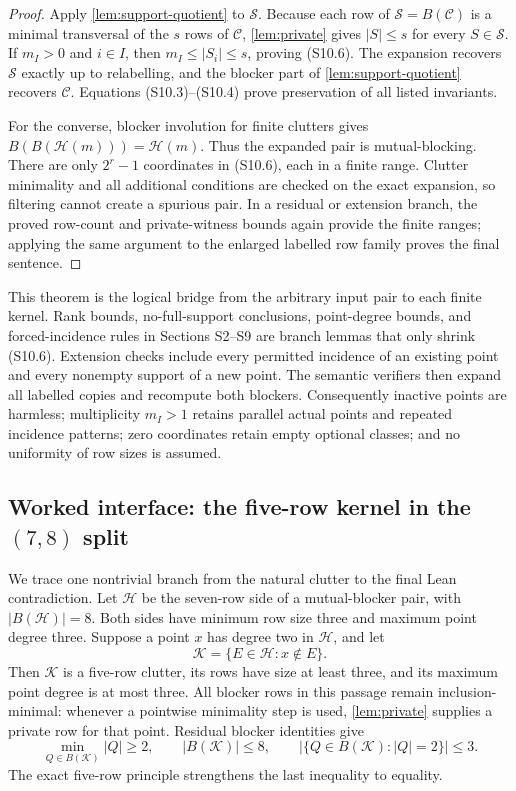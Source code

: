\documentclass[11pt,a4paper]{article}
\theoremstyle{definition}
\newcommand{\blocker}{B}
\begin{document}
\begin{proof}
Apply \cref{lem:support-quotient} to $\mathcal S$.  Because each row of
$\mathcal S=\blocker(\mathcal C)$ is a minimal transversal of the $s$ rows
of $\mathcal C$, \cref{lem:private} gives $|S|\leq s$ for every
$S\in\mathcal S$.  If $m_I>0$ and $i\in I$, then
$m_I\leq|S_i|\leq s$, proving (S10.6).  The expansion recovers
$\mathcal S$ exactly up to relabelling, and the blocker part of
\cref{lem:support-quotient} recovers $\mathcal C$.  Equations
(S10.3)--(S10.4) prove preservation of all listed invariants.

For the converse, blocker involution for finite clutters gives
$\blocker(\blocker(\mathcal H(m)))=\mathcal H(m)$.  Thus the expanded pair
is mutual-blocking.  There are only $2^r-1$ coordinates in (S10.6), each in a
finite range.  Clutter minimality and all additional conditions are checked
on the exact expansion, so filtering cannot create a spurious pair.  In a
residual or extension branch, the proved row-count and private-witness bounds
again provide the finite ranges; applying the same argument to the enlarged
labelled row family proves the final sentence.
\end{proof}

This theorem is the logical bridge from the arbitrary input pair to each
finite kernel.  Rank bounds, no-full-support conclusions, point-degree
bounds, and forced-incidence rules in Sections S2--S9 are branch lemmas that
only shrink (S10.6).  Extension checks include every permitted incidence of
an existing point and every nonempty support of a new point.  The semantic
verifiers then expand all labelled copies and recompute both blockers.
Consequently inactive points are harmless; multiplicity $m_I>1$ retains
parallel actual points and repeated incidence patterns; zero coordinates
retain empty optional classes; and no uniformity of row sizes is assumed.

\subsection{Worked interface: the five-row kernel in the
\texorpdfstring{$(7,8)$}{(7,8)} split}

We trace one nontrivial branch from the natural clutter to the final Lean
contradiction.  Let $\mathcal H$ be the seven-row side of a mutual-blocker
pair, with $|\blocker(\mathcal H)|=8$.  Both sides have minimum row size three
and maximum point degree three.  Suppose a point $x$ has degree two in
$\mathcal H$, and let
\[
 \mathcal K=\{E\in\mathcal H:x\notin E\}.
 \tag{S10.7}
\]
Then $\mathcal K$ is a five-row clutter, its rows have size at least three,
and its maximum point degree is at most three.  All blocker rows in this
passage remain inclusion-minimal: whenever a pointwise minimality step is
used, \cref{lem:private} supplies a private row for that point.  Residual
blocker identities
give
\[
 \min_{Q\in\blocker(\mathcal K)}|Q|\geq2,
 \qquad |\blocker(\mathcal K)|\leq8,
 \qquad |\{Q\in\blocker(\mathcal K):|Q|=2\}|\leq3.
 \tag{S10.8}
\]
The exact five-row principle strengthens the last inequality to equality.
\end{document}
